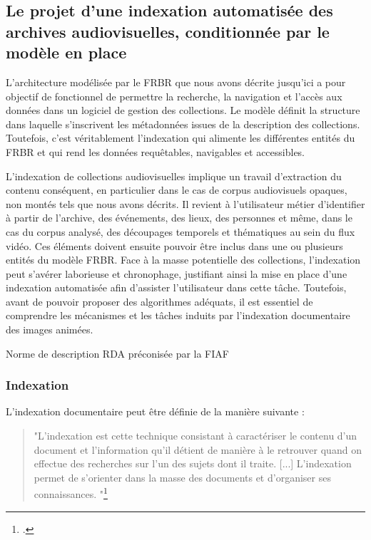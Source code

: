 \subsection{Le projet d'une indexation automatisée des archives audiovisuelles, conditionnée par le modèle en place}


L’architecture modélisée par le FRBR que nous avons décrite jusqu’ici a pour objectif de fonctionnel de permettre la recherche, la navigation et l’accès aux données dans un logiciel de gestion des collections. Le modèle définit la structure dans laquelle s’inscrivent les métadonnées issues de la description des collections. Toutefois, c’est véritablement l’indexation qui alimente les différentes entités du FRBR et qui rend les données requêtables, navigables et accessibles.  

L’indexation de collections audiovisuelles implique un travail d’extraction du contenu conséquent, en particulier dans le cas de corpus audiovisuels opaques, non montés tels que nous avons décrits. Il revient à l'utilisateur métier d’identifier à partir de l’archive, des événements, des lieux, des personnes et même, dans le cas du corpus analysé, des découpages temporels et thématiques au sein du flux vidéo. Ces éléments doivent ensuite pouvoir être inclus dans une ou plusieurs entités du modèle FRBR.  Face à la masse potentielle des collections, l’indexation peut s’avérer laborieuse et chronophage, justifiant ainsi la mise en place d’une indexation automatisée afin d’assister l’utilisateur dans cette tâche. Toutefois, avant de pouvoir proposer des algorithmes adéquats, il est essentiel de comprendre les mécanismes et les tâches induits par l’indexation documentaire des images animées.  

Norme de description RDA préconisée par la FIAF  

\subsubsection{Indexation} 

L’indexation documentaire peut être définie de la manière suivante :  

\begin{quote} 
	
	"L'indexation est cette technique consistant à caractériser le contenu d'un document et l'information qu'il détient de manière à le retrouver quand on effectue des recherches sur l'un des sujets dont il traite. [...] L'indexation permet de s'orienter dans la masse des documents et d'organiser ses connaissances. "\footcite{zotero-item-582} 
	
\end{quote} 

